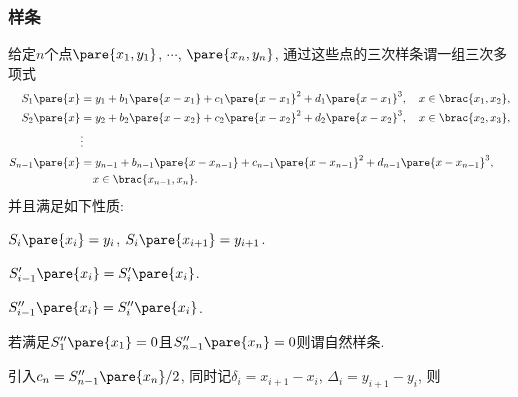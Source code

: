\documentclass[20pt]{extarticle}
\begin{document}
\subsubsection{样条} %
\label{ssub:样条}

给定$n$个点$\pare{x_1,y_1}$, $\cdots$, $\pare{x_n,y_n}$, 通过这些点的三次样条谓一组三次多项式
\begin{align*}
    S_1\pare{x} &= y_1 + b_1\pare{x-x_1} + c_1\pare{x-x_1}^2 + d_1\pare{x-x_1}^3,\quad x\in\brac{x_1,x_2}, \\
    S_2\pare{x} &= y_2 + b_2\pare{x-x_2} + c_2\pare{x-x_2}^2 + d_2\pare{x-x_2}^3,\quad x\in\brac{x_2,x_3}, \\
    &\vdots \\
    S_{n-1}\pare{x} &= y_{n-1} + b_{n-1}\pare{x - x_{n-1}} + c_{n-1}\pare{x-x_{n-1}}^2 + d_{n-1}\pare{x-x_{n-1}}^3, \\ &\phantom{=\ } x\in\brac{x_{n-1},x_n}.
\end{align*}
并且满足如下性质:
\begin{cenum}
    \item $S_i\pare{x_i} = y_i$, $S_i\pare{x_{i+1}} = y_{i+1}$.
    \item $S'_{i-1}\pare{x_i} = S'_i\pare{x_i}$.
    \item $S''_{i-1}\pare{x_i} = S''_i\pare{x_i}$.
\end{cenum}
若满足$S''_1\pare{x_1} = 0$且$S''_{n-1}\pare{x_n} = 0$则谓自然样条.
\par
引入$c_n = S''_{n-1}\pare{x_n}/2$, 同时记$\delta_i = x_{i+1} - x_i$, $\Delta_i = y_{i+1} - y_i$, 则
\end{document}
